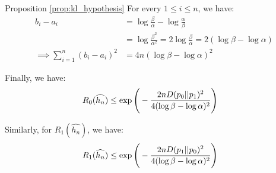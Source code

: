 \begin{proof*}{Proposition \ref{prop:kl_hypothesis}}
    \noindent For every $1 \le i \le n$, we have:
    \begin{align*}
        b_i - a_i &= \log\frac{\beta}{\alpha} - \log\frac{\alpha}{\beta} \\
            &= \log\frac{\beta^2}{\alpha^2} = 2\log\frac{\beta}{\alpha} = 2(\log\beta - \log\alpha)\\
        \implies \sum_{i=1}^n (b_i - a_i)^2 &= 4n(\log\beta - \log\alpha)^2
    \end{align*}

    \noindent Finally, we have:
    \begin{align*}
        R_0(\widehat{h_n}) 
            &\le \exp\Bigg( 
                -\frac{2nD(p_0||p_1)^2}{4(\log\beta - \log\alpha)^2}
             \Bigg)
    \end{align*}

    \noindent Similarly, for $R_1(\widehat{h_n})$, we have:
    \begin{align*}
        R_1(\widehat{h_n}) 
            &\le \exp\Bigg( 
                -\frac{2nD(p_1||p_0)^2}{4(\log\beta - \log\alpha)^2}
             \Bigg)
    \end{align*}
\end{proof*}
